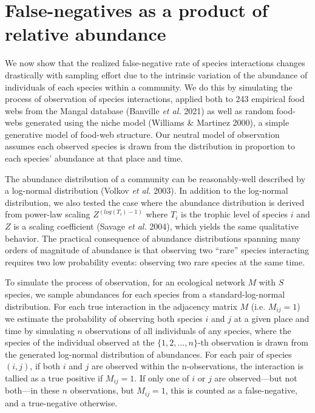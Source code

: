 \documentclass[10pt,oneside]{article}
\begin{document}
\hypertarget{false-negatives-as-a-product-of-relative-abundance}{%
\section{False-negatives as a product of relative
abundance}\label{false-negatives-as-a-product-of-relative-abundance}}

We now show that the realized false-negative rate of species
interactions changes drastically with sampling effort due to the
intrinsic variation of the abundance of individuals of each species
within a community. We do this by simulating the process of observation
of species interactions, applied both to 243 empirical food webs from
the Mangal database (Banville \emph{et al.} 2021) as well as random
food-webs generated using the niche model (Williams \& Martinez 2000), a
simple generative model of food-web structure. Our neutral model of
observation assumes each observed species is drawn from the distribution
in proportion to each species' abundance at that place and time.

The abundance distribution of a community can be reasonably-well
described by a log-normal distribution (Volkov \emph{et al.} 2003). In
addition to the log-normal distribution, we also tested the case where
the abundance distribution is derived from power-law scaling
\(Z^{(log(T_i)-1)}\) where \(T_i\) is the trophic level of species \(i\)
and \(Z\) is a scaling coefficient (Savage \emph{et al.} 2004), which
yields the same qualitative behavior. The practical consequence of
abundance distributions spanning many orders of magnitude of abundance
is that observing two ``rare'' species interacting requires two low
probability events: observing two rare species at the same time.

To simulate the process of observation, for an ecological network \(M\)
with \(S\) species, we sample abundances for each species from a
standard-log-normal distribution. For each true interaction in the
adjacency matrix \(M\) (i.e. \(M_{ij}=1\)) we estimate the probability
of observing both species \(i\) and \(j\) at a given place and time by
simulating \(n\) observations of all individuals of any species, where
the species of the individual observed at the \(\{1,2,\dots,n\}\)-th
observation is drawn from the generated log-normal distribution of
abundances. For each pair of species \((i,j)\), if both \(i\) and \(j\)
are observed within the n-observations, the interaction is tallied as a
true positive if \(M_{ij}=1\). If only one of \(i\) or \(j\) are
observed---but not both---in these \(n\) observations, but \(M_{ij}=1\),
this is counted as a false-negative, and a true-negative otherwise.
\end{document}
